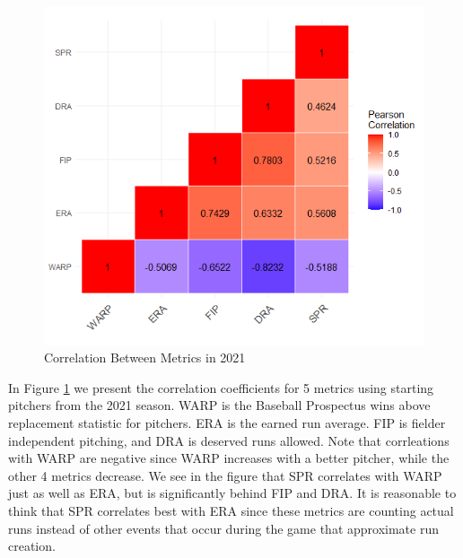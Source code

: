\documentclass [52pt] {article}
\begin{document}
 \begin{figure}
        \centering
        \includegraphics[scale = 0.7]{Plots/IntermetricCorr.png}
        \caption{Correlation Between Metrics in 2021}
        \label{fig : corr_metrics}
    \end{figure}
    
In Figure \ref{fig : corr_metrics}  we present the correlation coefficients for 5 metrics using starting pitchers from the 2021 season.  WARP is the Baseball Prospectus wins above replacement statistic for pitchers.  ERA is the earned run average.  FIP is fielder independent pitching, and DRA is deserved runs allowed.  Note that corrleations with WARP are negative since WARP increases with a better pitcher, while the other 4 metrics decrease.  We see in the figure that SPR correlates with WARP just as well as ERA, but is significantly behind FIP and DRA.  It is reasonable to think that SPR correlates best with ERA since these metrics are counting actual runs instead of other events that occur during the game that approximate run creation.
\end{document}
